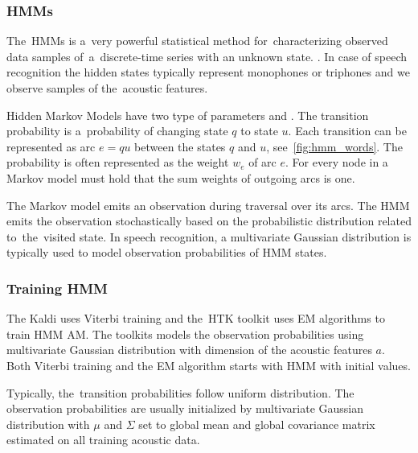 {\subsubsection*{\acfp{HMM}}
The~\acp{HMM} is a~very powerful statistical method for~characterizing observed data samples
of~a~discrete-time series with an unknown state. \cite{huang2001spoken}. %
In case of speech recognition the hidden states typically represent monophones or triphones and we observe samples of the~acoustic features.

Hidden Markov Models have two type of parameters 
and .
The transition probability is a~probability of changing state $q$ to state $u$.
Each transition can be represented as arc $e=qu$ between the states $q$ and $u$, see~\ref{fig:hmm_words}.
The probability is often represented as the weight $w_e$ of arc $e$.
For every node in a Markov model must hold that the sum weights of outgoing arcs is one.

The Markov model emits an observation during traversal over its arcs.
The \acl{HMM} emits the observation stochastically based on the probabilistic distribution related to~the~visited state.
In speech recognition, a multivariate Gaussian distribution is typically used to model observation probabilities of \ac{HMM} states.

\subsubsection*{Training \ac{HMM}}
\label{sub:trainhmm}

The Kaldi uses Viterbi training and the~\ac{HTK} toolkit uses \acl{EM} algorithms to train \ac{HMM} \acl{AM}.
The toolkits models the observation probabilities using multivariate Gaussian distribution 
with dimension of the acoustic features $a$.
Both Viterbi training and the \ac{EM} algorithm starts with \ac{HMM} with initial values. 

Typically, the~transition probabilities follow uniform distribution.
The observation probabilities are usually initialized by multivariate Gaussian distribution
with $\mu$ and $\Sigma$ set to global mean and global covariance matrix 
estimated on all training acoustic data.

}
